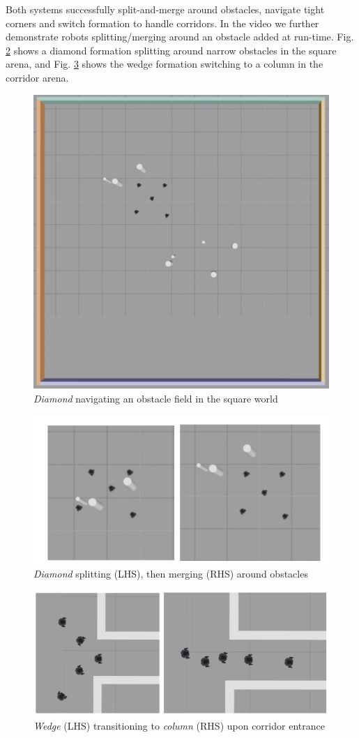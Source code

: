 \documentclass[letterpaper, 10 pt, conference]{ieeeconf}  %
\begin{document}
Both systems successfully split-and-merge around obstacles, navigate tight corners and switch formation to handle corridors. In the video we further demonstrate robots splitting/merging around an obstacle added at run-time. Fig. \ref{fig:split_merge} shows a diamond formation splitting around narrow obstacles in the square arena, and Fig. \ref{fig:switch_formation} shows the wedge formation switching to a column in the corridor arena.

\begin{figure}[tb]
\centering
\includegraphics[width=0.7\linewidth]{images/square.png}
\caption{\textit{Diamond} navigating an obstacle field in the square world}
\label{fig:square}
\end{figure}

\begin{figure}[tb]
\centering
\includegraphics[width=0.8\linewidth]{images/split_merge.png}
\caption{\textit{Diamond} splitting (LHS), then merging (RHS) around obstacles}
\label{fig:split_merge}
\end{figure}

\begin{figure}[tb]
\centering
\includegraphics[width=0.9\linewidth]{images/switch_formation.png}
\caption{\textit{Wedge} (LHS) transitioning to \textit{column} (RHS) upon corridor entrance}
\label{fig:switch_formation}
\end{figure}
\end{document}
